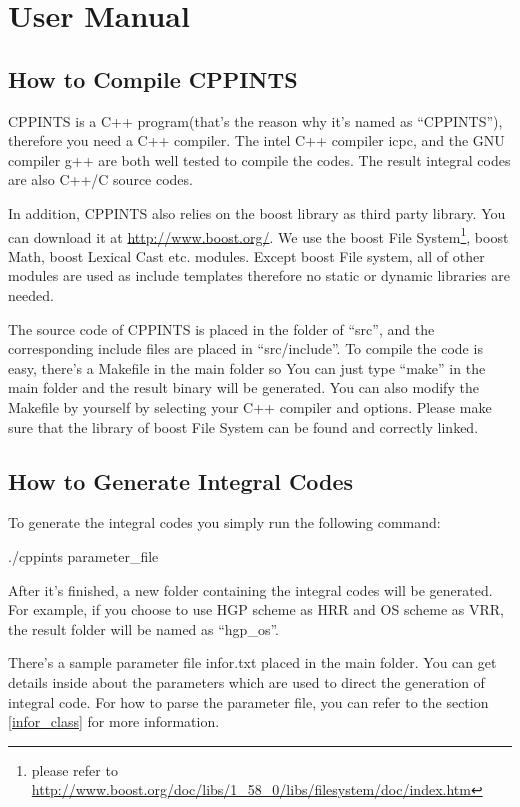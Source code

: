 %
% 
%
\chapter{User Manual}



\section{How to Compile CPPINTS}
%
%
CPPINTS is a C++ program(that's the reason why it's named as ``CPPINTS''), 
therefore you need a C++ compiler. The intel C++ compiler icpc, and the 
GNU compiler g++ are both well tested to compile the codes. The result
integral codes are also C++/C source codes.

In addition, CPPINTS also relies on the boost library as third party 
library. You can download it at \url{http://www.boost.org/}. We use 
the boost File System\footnote{please refer to 
\url{http://www.boost.org/doc/libs/1_58_0/libs/filesystem/doc/index.htm}},
boost Math, boost Lexical Cast etc. modules. Except boost File system,
all of other modules are used as include templates therefore no static or 
dynamic libraries are needed.

The source code of CPPINTS is placed in the folder of ``src'', and the 
corresponding include files are placed in ``src/include''. To compile
the code is easy, there's a Makefile in the main folder so You 
can just type ``make'' in the main folder and the result binary 
will be generated. You can also modify the Makefile by yourself by 
selecting your C++ compiler and options. Please make sure that the library
of boost File System can be found and correctly linked. 

\section{How to Generate Integral Codes}
%
%
%
\label{generate_int_codes}
To generate the integral codes you simply run the following command:
\begin{center}
 ./cppints parameter\_file
\end{center}
After it's finished, a new folder containing the integral codes will be 
generated. For example, if you choose to use HGP scheme as HRR and OS
scheme as VRR, the result folder will be named as ``hgp\_os''.

There's a sample parameter file infor.txt placed in the main folder.
You can get details inside about the parameters which are used to direct the 
generation of integral code. For how to parse the parameter file,
you can refer to the section  \ref{infor_class} for more information.

